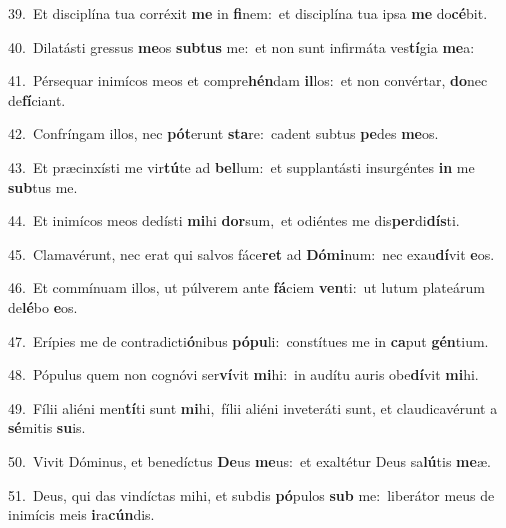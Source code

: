 {\numbfont\textcolor{\numbcolor}{39.}}~Et disciplína tua corréxit \textbf{me} in \textbf{fi}\-nem:~\star et disciplína tua ipsa \textbf{me} do\-\textbf{cé}\-bit.\par
{\numbfont\textcolor{\numbcolor}{40.}}~Dilatásti gressus \textbf{me}\-os \textbf{sub}\-\textbf{tus} me:~\star et non sunt infirmáta ves\-\textbf{tí}\-gia \textbf{me}\-a:\par
{\numbfont\textcolor{\numbcolor}{41.}}~Pérsequar inimícos meos et compre\-\textbf{hén}\-dam \textbf{il}\-los:~\star et non convértar, \textbf{do}\-nec de\-\textbf{fí}\-ciant.\par
{\numbfont\textcolor{\numbcolor}{42.}}~Confríngam illos, nec \textbf{pót}\-erunt \textbf{sta}\-re:~\star cadent subtus \textbf{pe}\-des \textbf{me}\-os.\par
{\numbfont\textcolor{\numbcolor}{43.}}~Et præcinxísti me vir\-\textbf{tú}\-te ad \textbf{bel}\-lum:~\star et supplantásti insurgéntes \textbf{in} me \textbf{sub}\-tus me.\par
{\numbfont\textcolor{\numbcolor}{44.}}~Et inimícos meos dedísti \textbf{mi}\-hi \textbf{dor}\-sum,~\star et odiéntes me dis\-\textbf{per}\-di\-\textbf{dís}\-ti.\par
{\numbfont\textcolor{\numbcolor}{45.}}~Clamavérunt, nec erat qui salvos fáce\textbf{ret} ad \textbf{Dó}\-\textbf{mi}num:~\star nec exau\-\textbf{dí}\-vit \textbf{e}\-os.\par
{\numbfont\textcolor{\numbcolor}{46.}}~Et commínuam illos, ut púlverem ante \textbf{fá}\-ciem \textbf{ven}\-ti:~\star ut lutum plateárum de\-\textbf{lé}\-bo \textbf{e}\-os.\par
{\numbfont\textcolor{\numbcolor}{47.}}~Erípies me de contradicti\-\textbf{ó}\-nibus \textbf{pó}\-\textbf{pu}li:~\star constítues me in \textbf{ca}\-put \textbf{gén}\-tium.\par
{\numbfont\textcolor{\numbcolor}{48.}}~Pópulus quem non cognóvi ser\-\textbf{ví}\-vit \textbf{mi}\-hi:~\star in audítu auris obe\-\textbf{dí}\-vit \textbf{mi}\-hi.\par
{\numbfont\textcolor{\numbcolor}{49.}}~Fílii aliéni men\-\textbf{tí}\-ti sunt \textbf{mi}\-hi,~\star fílii aliéni inveteráti sunt, et claudicavérunt a \textbf{sé}\-mitis \textbf{su}\-is.\par
{\numbfont\textcolor{\numbcolor}{50.}}~Vivit Dóminus, et benedíctus \textbf{De}\-us \textbf{me}\-us:~\star et exaltétur Deus sa\-\textbf{lú}\-tis \textbf{me}\-æ.\par
{\numbfont\textcolor{\numbcolor}{51.}}~Deus, qui das vindíctas mihi, et subdis \textbf{pó}\-pulos \textbf{sub} me:~\star liberátor meus de inimícis meis \textbf{i}\-ra\-\textbf{cún}\-dis.\par
